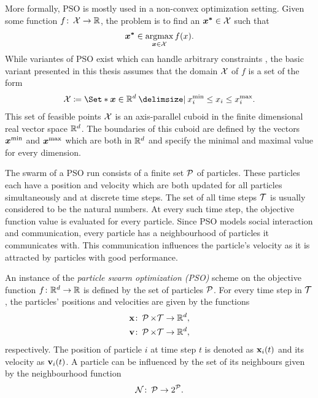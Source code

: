 More formally, PSO is mostly used in a non-convex optimization setting.
Given some function $f \colon \operatorname{\mathcal{X}} \to \mathbb{R}$, the problem is to find an $\bm{x^\ast} \in \operatorname{\mathcal{X}}$ such that
\begin{align}
    \bm{x^\ast} \in \operatorname*{argmax}_{\bm{x} \in \operatorname{\mathcal{X}}} f(x).
\end{align}
While variantes of PSO exist which can handle arbitrary constraints \cite{engelbrecht_fundamentals_2006}, the basic variant presented in this thesis assumes that the domain $\operatorname{\mathcal{X}}$ of $f$ is a set of the form
\begin{align}
    \X \coloneqq \Set*{\mat{x} \in \R^d \with x^{\text{min}}_i \leq x_i \leq x^{\text{max}}_i}.
\end{align}
This set of feasible points $\operatorname{\mathcal{X}}$ is an axis-parallel cuboid in the finite dimensional real vector space $\mathbb{R}^d$.
The boundaries of this cuboid are defined by the vectors $\bm{x^{\text{min}}}$ and $\bm{x^{\text{max}}}$ which are both in $\mathbb{R}^d$ and specify the minimal and maximal value for every dimension.

The swarm of a PSO run consists of a finite set $\operatorname{\mathcal{P}}$ of particles.
These particles each have a position and velocity which are both updated for all particles simultaneously and at discrete time steps.
The set of all time steps $\mathcal{T}$ is usually considered to be the natural numbers.
At every such time step, the objective function value is evaluated for every particle.
Since PSO models social interaction and communication, every particle has a neighbourhood of particles it communicates with.
This communication influences the particle's velocity as it is attracted by particles with good performance.
\begin{definition}
    An instance of the \emph{particle swarm optimization (PSO)} scheme on the objective function $f \colon \mathbb{R}^d \to \mathbb{R}$ is defined by the set of particles $\operatorname{\mathcal{P}}$.
    For every time step in $\mathcal{T}$, the particles' positions and velocities are given by the functions
    \begin{align}
        \operatorname{\mathbf{x}} &\colon \operatorname{\mathcal{P}} \times \mathcal{T} \to \mathbb{R}^d, \\
        \operatorname{\mathbf{v}} &\colon \operatorname{\mathcal{P}} \times \mathcal{T} \to \mathbb{R}^d,
    \end{align}
    respectively. The position of particle $i$ at time step $t$ is denoted as $\operatorname{\mathbf{x}}_i(t)$ and its velocity as $\operatorname{\mathbf{v}}_i(t)$. A particle can be influenced by the set of its neighbours given by the neighbourhood function
    \begin{align}
        \operatorname{\mathcal{N}} \colon \operatorname{\mathcal{P}} \to 2^{\operatorname{\mathcal{P}}}.
    \end{align}
\end{definition}


